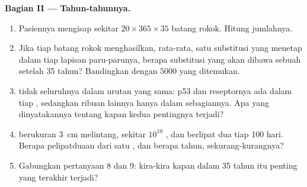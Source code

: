 \begin{problem}
\medskip
\noindent\textbf{Bagian II --- Tahun-tahunnya.}
\begin{enumerate}[resume]
  \item Pasiennya mengisap sekitar $20 \times 365 \times 35$
        batang rokok. Hitung jumlahnya.
  \item Jika tiap batang rokok menghasilkan, rata-rata, satu
        substitusi yang menetap dalam tiap  lapisan paru-parunya,
        berapa substitusi yang akan dibawa sebuah  setelah 35 tahun?
        Bandingkan dengan $\num{5000}$ yang ditemukan.
  \item {}  tidak seluruhnya dalam urutan  yang sama:
         p53 dan reseptornya ada dalam tiap  ,
        sedangkan ribuan lainnya hanya dalam sebagiannya. Apa yang
        dinyatakannya tentang kapan kedua  pentingnya terjadi?
  \item {} berukuran \qty{3}{cm} melintang, sekitar $10^{10}$
        , dan   berlipat dua tiap 100 hari. Berapa
        pelipatduaan dari satu , dan berapa tahun, sekurang-kurangnya?
  \item Gabungkan pertanyaan 8 dan 9: kira-kira kapan dalam 35 tahun
        itu  penting yang terakhir terjadi?
\end{enumerate}


\end{problem}
